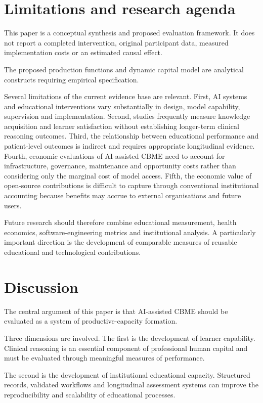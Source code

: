 \documentclass[11pt,a4paper]{article}
\begin{document}
\section{Limitations and research agenda}
This paper is a conceptual synthesis and proposed evaluation framework. It does not report a completed intervention, original participant data, measured implementation costs or an estimated causal effect.

The proposed production functions and dynamic capital model are analytical constructs requiring empirical specification.

Several limitations of the current evidence base are relevant. First, AI systems and educational interventions vary substantially in design, model capability, supervision and implementation. Second, studies frequently measure knowledge acquisition and learner satisfaction without establishing longer-term clinical reasoning outcomes. Third, the relationship between educational performance and patient-level outcomes is indirect and requires appropriate longitudinal evidence. Fourth, economic evaluations of AI-assisted CBME need to account for infrastructure, governance, maintenance and opportunity costs rather than considering only the marginal cost of model access. Fifth, the economic value of open-source contributions is difficult to capture through conventional institutional accounting because benefits may accrue to external organisations and future users.

Future research should therefore combine educational measurement, health economics, software-engineering metrics and institutional analysis. A particularly important direction is the development of comparable measures of reusable educational and technological contributions.

\section{Discussion}
The central argument of this paper is that AI-assisted CBME should be evaluated as a system of productive-capacity formation.

Three dimensions are involved. The first is the development of learner capability. Clinical reasoning is an essential component of professional human capital and must be evaluated through meaningful measures of performance.

The second is the development of institutional educational capacity. Structured records, validated workflows and longitudinal assessment systems can improve the reproducibility and scalability of educational processes.
\end{document}
